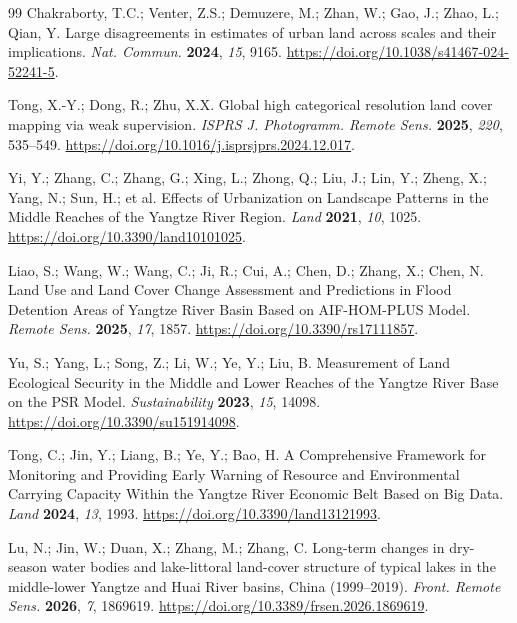 \documentclass[remotesensing,article,submit,moreauthors]{Definitions/mdpi}
\begin{document}
\begin{thebibliography}{99}
Chakraborty, T.C.; Venter, Z.S.; Demuzere, M.; Zhan, W.; Gao, J.; Zhao, L.;
Qian, Y. Large disagreements in estimates of urban land across scales and their
implications. \textit{Nat. Commun.} \textbf{2024}, \textit{15}, 9165.
\href{https://doi.org/10.1038/s41467-024-52241-5}{https://doi.org/10.1038/s41467-024-52241-5}.

Tong, X.-Y.; Dong, R.; Zhu, X.X.
Global high categorical resolution land cover mapping via weak supervision.
\textit{ISPRS J. Photogramm. Remote Sens.} \textbf{2025}, \textit{220}, 535--549.
\href{https://doi.org/10.1016/j.isprsjprs.2024.12.017}{https://doi.org/10.1016/j.isprsjprs.2024.12.017}.

Yi, Y.; Zhang, C.; Zhang, G.; Xing, L.; Zhong, Q.; Liu, J.; Lin, Y.; Zheng, X.;
Yang, N.; Sun, H.; et al.
Effects of Urbanization on Landscape Patterns in the Middle Reaches of the
Yangtze River Region. \textit{Land} \textbf{2021}, \textit{10}, 1025.
\href{https://doi.org/10.3390/land10101025}{https://doi.org/10.3390/land10101025}.

Liao, S.; Wang, W.; Wang, C.; Ji, R.; Cui, A.; Chen, D.; Zhang, X.; Chen, N.
Land Use and Land Cover Change Assessment and Predictions in Flood Detention
Areas of Yangtze River Basin Based on AIF-HOM-PLUS Model. \textit{Remote Sens.}
\textbf{2025}, \textit{17}, 1857.
\href{https://doi.org/10.3390/rs17111857}{https://doi.org/10.3390/rs17111857}.

Yu, S.; Yang, L.; Song, Z.; Li, W.; Ye, Y.; Liu, B.
Measurement of Land Ecological Security in the Middle and Lower Reaches of the
Yangtze River Base on the PSR Model. \textit{Sustainability} \textbf{2023},
\textit{15}, 14098.
\href{https://doi.org/10.3390/su151914098}{https://doi.org/10.3390/su151914098}.

Tong, C.; Jin, Y.; Liang, B.; Ye, Y.; Bao, H.
A Comprehensive Framework for Monitoring and Providing Early Warning of Resource
and Environmental Carrying Capacity Within the Yangtze River Economic Belt Based
on Big Data. \textit{Land} \textbf{2024}, \textit{13}, 1993.
\href{https://doi.org/10.3390/land13121993}{https://doi.org/10.3390/land13121993}.

Lu, N.; Jin, W.; Duan, X.; Zhang, M.; Zhang, C.
Long-term changes in dry-season water bodies and lake-littoral land-cover
structure of typical lakes in the middle-lower Yangtze and Huai River basins,
China (1999--2019). \textit{Front. Remote Sens.} \textbf{2026}, \textit{7},
1869619.
\href{https://doi.org/10.3389/frsen.2026.1869619}{https://doi.org/10.3389/frsen.2026.1869619}.


\end{thebibliography}
\end{document}
